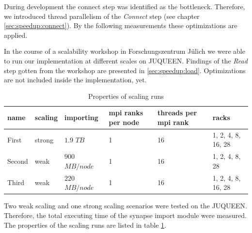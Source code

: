 \newpage
During development the connect step was identified as the bottleneck.
Therefore, we introduced thread parallelism of the \emph{Connect} step (see chapter \ref{sec:speedup:connect}).
By the following measurements these optimizations are applied.

In the course of a scalability workshop in Forschungszentrum J\"{u}lich we were able to run
our implementation at different scales on JUQUEEN.
Findings of the \emph{Read} step gotten from the workshop are presented in \ref{sec:speedup:load}.
Optimizations are not included inside the implementation, yet.
\begin{table}[ht!]
\begin{center}
\begin{tabular}{|l|l|l|p{1.9cm}|p{2.1cm}|l|}
\hline
name & scaling & importing & mpi ranks per node & threads per mpi rank & racks \\
\hline\hline
First    &  strong  & $1.9$ $TB$             & 1 & 16 & 1, 2, 4, 8, 16, 28 \\
Second    &  weak  & $900$ $MB/node$      & 1 & 16 & 1, 2, 4, 8, 28 \\
Third    &  weak  & $220$ $MB/node$     & 1 & 16 & 1, 2, 4, 8, 16, 28 \\
\hline
\end{tabular}
\end{center}
\caption{Properties of scaling runs}
\label{schumann:tbl:runs}
\end{table}

Two weak scaling and one strong scaling scenarios were tested on the JUQUEEN.
Therefore, the total executing time of the synapse import module were measured.
The properties of the scaling runs are listed in table \ref{schumann:tbl:runs}.


